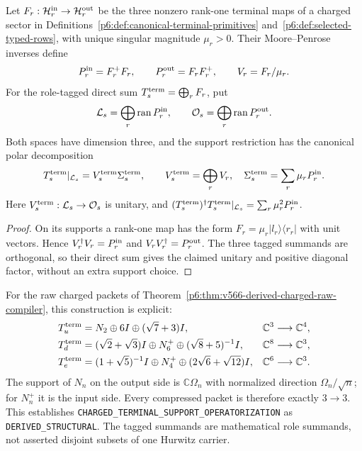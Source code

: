 \documentclass[12pt,a4paper]{article}
\begin{document}
\begin{theorem}
\label{p6:thm:v585-terminal-support-operator}
Let $F_r:\mathcal H_r^{\rm in}\to\mathcal H_r^{\rm out}$ be the three
nonzero rank-one terminal maps of a charged sector in
Definitions~\ref{p6:def:canonical-terminal-primitives}
and~\ref{p6:def:selected-typed-rows}, with unique singular magnitude
$\mu_r>0$. Their Moore--Penrose inverses define
\[
 P_r^{\rm in}=F_r^+F_r,\qquad P_r^{\rm out}=F_rF_r^+,
 \qquad V_r=F_r/\mu_r.
\]
For the role-tagged direct sum $T_s^{\rm term}=\bigoplus_rF_r$, put
\[
 \mathcal L_s=\bigoplus_r\operatorname{ran}P_r^{\rm in},\qquad
 \mathcal O_s=\bigoplus_r\operatorname{ran}P_r^{\rm out}.
\]
Both spaces have dimension three, and the support restriction has the
canonical polar decomposition
\[
 T_s^{\rm term}|_{\mathcal L_s}=V_s^{\rm term}\Sigma_s^{\rm term},\qquad
 V_s^{\rm term}=\bigoplus_rV_r,\quad
 \Sigma_s^{\rm term}=\sum_r\mu_rP_r^{\rm in}.
\]
Here $V_s^{\rm term}:\mathcal L_s\to\mathcal O_s$ is unitary, and
$(T_s^{\rm term})^\dagger T_s^{\rm term}|_{\mathcal L_s}
=\sum_r\mu_r^2P_r^{\rm in}$.
\end{theorem}
\begin{proof}
On its supports a rank-one map has the form
$F_r=\mu_r|l_r\rangle\langle r_r|$ with unit vectors. Hence
$V_r^\dagger V_r=P_r^{\rm in}$ and $V_rV_r^\dagger=P_r^{\rm out}$.
The three tagged summands are orthogonal, so their direct sum gives the
claimed unitary and positive diagonal factor, without an extra support choice.
\end{proof}

For the raw charged packets of
Theorem~\ref{p6:thm:v566-derived-charged-raw-compiler}, this construction is
explicit:
\begin{align*}
 T_u^{\rm term}&=N_2\oplus6I\oplus(\sqrt7+3)I,&
 &\mathbb C^3\longrightarrow\mathbb C^4,\\
 T_d^{\rm term}&=(\sqrt2+\sqrt3)I\oplus N_6^+
                 \oplus(\sqrt8+5)^{-1}I,&
 &\mathbb C^8\longrightarrow\mathbb C^3,\\
 T_e^{\rm term}&=(1+\sqrt5)^{-1}I\oplus N_4^+
                 \oplus(2\sqrt6+\sqrt{12})I,&
 &\mathbb C^6\longrightarrow\mathbb C^3.
\end{align*}
The support of $N_n$ on the output side is $\mathbb C\Omega_n$ with
normalized direction $\Omega_n/\sqrt n$; for $N_n^+$ it is the input side.
Every compressed packet is therefore exactly $3\to3$.
This establishes \texttt{CHARGED\_TERMINAL\_SUPPORT\_OPERATORIZATION}
as \texttt{DERIVED\_STRUCTURAL}. The tagged summands are mathematical role
summands, not asserted disjoint subsets of one Hurwitz carrier.
\end{document}

